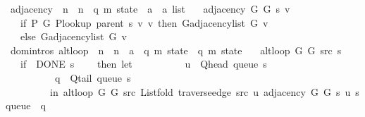 \begin{isabellebody}
\isanewline
{}\isamarkupfalse%
\ adjacency\ {\isacharcolon}{\kern0pt}{\isacharcolon}{\kern0pt}\ {\isachardoublequoteopen}{\isacharprime}{\kern0pt}n\ {\isasymRightarrow}\ {\isacharprime}{\kern0pt}n\ {\isasymRightarrow}\ {\isacharparenleft}{\kern0pt}{\isacharprime}{\kern0pt}q{\isacharcomma}{\kern0pt}\ {\isacharprime}{\kern0pt}m{\isacharparenright}{\kern0pt}\ state\ {\isasymRightarrow}\ {\isacharprime}{\kern0pt}a\ {\isasymRightarrow}\ {\isacharprime}{\kern0pt}a\ list{\isachardoublequoteclose}\ \isanewline
\ \ {\isachardoublequoteopen}adjacency\ G{}\ G{}\ s\ v\ {\isasymequiv}\isanewline
\ \ \ if\ P{\isacharprime}{\kern0pt}\ G{}\ {\isacharparenleft}{\kern0pt}P{\isacharunderscore}{\kern0pt}lookup\ {\isacharparenleft}{\kern0pt}parent\ s{\isacharparenright}{\kern0pt}\ v{\isacharparenright}{\kern0pt}\ v\ then\ G{\isachardot}{\kern0pt}adjacency{\isacharunderscore}{\kern0pt}list\ G{}\ v\isanewline
\ \ \ else\ G{\isachardot}{\kern0pt}adjacency{\isacharunderscore}{\kern0pt}list\ G{}\ v{\isachardoublequoteclose}\isanewline
\isanewline
{}\isamarkupfalse%
\ {\isacharparenleft}{\kern0pt}domintros{\isacharparenright}{\kern0pt}\ alt{\isacharunderscore}{\kern0pt}loop\ {\isacharcolon}{\kern0pt}{\isacharcolon}{\kern0pt}\ {\isachardoublequoteopen}{\isacharprime}{\kern0pt}n\ {\isasymRightarrow}\ {\isacharprime}{\kern0pt}n\ {\isasymRightarrow}\ {\isacharprime}{\kern0pt}a\ {\isasymRightarrow}\ {\isacharparenleft}{\kern0pt}{\isacharprime}{\kern0pt}q{\isacharcomma}{\kern0pt}\ {\isacharprime}{\kern0pt}m{\isacharparenright}{\kern0pt}\ state\ {\isasymRightarrow}\ {\isacharparenleft}{\kern0pt}{\isacharprime}{\kern0pt}q{\isacharcomma}{\kern0pt}\ {\isacharprime}{\kern0pt}m{\isacharparenright}{\kern0pt}\ state{\isachardoublequoteclose}\ \isanewline
\ \ {\isachardoublequoteopen}alt{\isacharunderscore}{\kern0pt}loop\ G{}\ G{}\ src\ s\ {\isacharequal}{\kern0pt}\isanewline
\ \ \ {\isacharparenleft}{\kern0pt}if\ {\isasymnot}\ DONE\ s\isanewline
\ \ \ \ then\ let\isanewline
\ \ \ \ \ \ \ \ \ \ u\ {\isacharequal}{\kern0pt}\ Q{\isacharunderscore}{\kern0pt}head\ {\isacharparenleft}{\kern0pt}queue\ s{\isacharparenright}{\kern0pt}{\isacharsemicolon}{\kern0pt}\isanewline
\ \ \ \ \ \ \ \ \ \ q\ {\isacharequal}{\kern0pt}\ Q{\isacharunderscore}{\kern0pt}tail\ {\isacharparenleft}{\kern0pt}queue\ s{\isacharparenright}{\kern0pt}\isanewline
\ \ \ \ \ \ \ \ \ in\ alt{\isacharunderscore}{\kern0pt}loop\ G{}\ G{}\ src\ {\isacharparenleft}{\kern0pt}List{\isachardot}{\kern0pt}fold\ {\isacharparenleft}{\kern0pt}traverse{\isacharunderscore}{\kern0pt}edge\ src\ u{\isacharparenright}{\kern0pt}\ {\isacharparenleft}{\kern0pt}adjacency\ G{}\ G{}\ s\ u{\isacharparenright}{\kern0pt}\ {\isacharparenleft}{\kern0pt}s{\isasymlparr}queue\ {\isacharcolon}{\kern0pt}{\isacharequal}{\kern0pt}\ q{\isasymrparr}{\isacharparenright}{\kern0pt}{\isacharparenright}{\kern0pt}\isanewline

\end{isabellebody}
